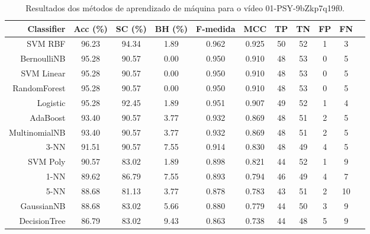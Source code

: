 \begin{table}[!htb]
\centering
\caption{Resultados dos métodos de aprendizado de máquina para o vídeo 01-PSY-9bZkp7q19f0.}
\label{tab:01-PSY-9bZkp7q19f0}
\begin{tabular}{r|c|c|c|c|c|c|c|c|c|c}
\hline\hline
Classifier & Acc (\%) & SC (\%) & BH (\%) & F-medida & MCC & TP & TN & FP & FN \\ \hline
SVM RBF & 96.23 & 94.34 & 1.89 & 0.962 & 0.925 & 50 & 52 & 1 & 3 \\ 
BernoulliNB & 95.28 & 90.57 & 0.00 & 0.950 & 0.910 & 48 & 53 & 0 & 5 \\ 
SVM Linear & 95.28 & 90.57 & 0.00 & 0.950 & 0.910 & 48 & 53 & 0 & 5 \\ 
RandomForest & 95.28 & 90.57 & 0.00 & 0.950 & 0.910 & 48 & 53 & 0 & 5 \\ 
Logistic & 95.28 & 92.45 & 1.89 & 0.951 & 0.907 & 49 & 52 & 1 & 4 \\ 
AdaBoost & 93.40 & 90.57 & 3.77 & 0.932 & 0.869 & 48 & 51 & 2 & 5 \\ 
MultinomialNB & 93.40 & 90.57 & 3.77 & 0.932 & 0.869 & 48 & 51 & 2 & 5 \\ 
3-NN & 91.51 & 90.57 & 7.55 & 0.914 & 0.830 & 48 & 49 & 4 & 5 \\ 
SVM Poly & 90.57 & 83.02 & 1.89 & 0.898 & 0.821 & 44 & 52 & 1 & 9 \\ 
1-NN & 89.62 & 86.79 & 7.55 & 0.893 & 0.794 & 46 & 49 & 4 & 7 \\ 
5-NN & 88.68 & 81.13 & 3.77 & 0.878 & 0.783 & 43 & 51 & 2 & 10 \\ 
GaussianNB & 88.68 & 83.02 & 5.66 & 0.880 & 0.779 & 44 & 50 & 3 & 9 \\ 
DecisionTree & 86.79 & 83.02 & 9.43 & 0.863 & 0.738 & 44 & 48 & 5 & 9 \\ 
\hline\hline
\end{tabular}
\end{table}
